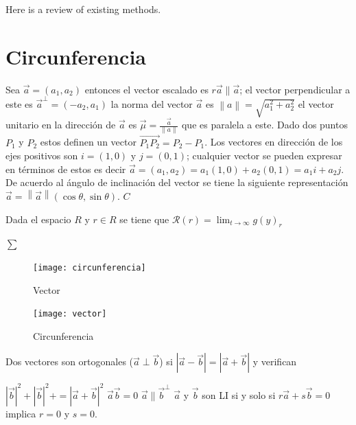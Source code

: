 \documentclass[10pt,]{krantz}
\theoremstyle{definition}
\theoremstyle{definition}
\theoremstyle{definition}
\theoremstyle{remark}
\let\BeginKnitrBlock\begin \let\EndKnitrBlock\end
\begin{document}
Here is a review of existing methods.

\hypertarget{circunferencia}{%
\chapter{Circunferencia}\label{circunferencia}}

Sea \(\vec{a}=(a_1,a_2)\) entonces el vector escalado es \(r\vec{a}\parallel\vec{a}\); el vector perpendicular a este es \(\vec{a}^\perp=(-a_2,a_1)\) la norma del vector \(\vec{a}\) es \(\left\|a\right\|=\sqrt{a_1^2+a_2^2}\) el vector unitario en la dirección de \(\vec{a}\) es \(\vec{\mu}=\frac{\vec{a}}{\left\|a\right\|}\) que es paralela a este. Dado dos puntos \(P_1\) y \(P_2\) estos definen un vector \(\vec{P_1P_2}=P_2-P_1\). Los vectores en dirección de los ejes positivos son \(i=(1,0)\) y \(j=(0,1)\); cualquier vector se pueden expresar en términos de estos es decir \(\vec{a}=(a_1,a_2)=a_1(1,0)+a_2(0,1)=a_1i+a_2j\). De acuerdo al ángulo de inclinación del vector se tiene la siguiente representación \(\vec{a}=\left\|\vec{a}\right\|(\cos\theta,\sin\theta)\). \(C\)

\BeginKnitrBlock{theorem}[russ]
\protect\hypertarget{thm:www}{}{\label{thm:www} {} }Dada el espacio \(R\) y \(r\in R\) se tiene que \(\mathcal{R}(r)=\lim_{t\to\infty}g(y)_r\)
\EndKnitrBlock{theorem}

\(\sum\)

\begin{figure}

{\centering \texttt{[image: circunferencia]} 

}

\caption{Vector}\label{fig:C1}
\end{figure}

\begin{figure}

{\centering \texttt{[image: vector]} 

}

\caption{Circunferencia}\label{fig:C2}
\end{figure}

Dos vectores son ortogonales (\(\vec{a}\perp\vec{b}\)) si \(\left|\vec{a}-\vec{b}\right|=\left|\vec{a}+\vec{b}\right|\) y verifican

\(\left|\vec{b}\right|^2+\left|\vec{b}\right|^2+=\left|\vec{a}+\vec{b}\right|^2\)
\(\vec{a}\vec{b}=0\)
\(\vec{a}\parallel\vec{b}^\perp\)
\(\vec{a}\) y \(\vec{b}\) son LI si y solo si \(r\vec{a}+s\vec{b}=0\) implica \(r=0\) y \(s=0\).
\end{document}
